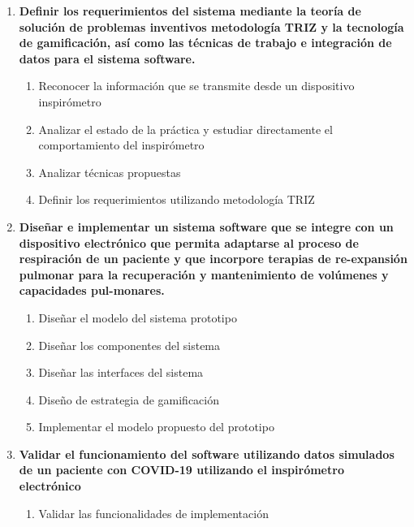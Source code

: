 \begin{enumerate}
\begin{enumerate}
  \end{enumerate}
  \item \textbf{Definir los requerimientos del sistema mediante la teor\'ia de soluci\'on de problemas inventivos metodolog\'ia TRIZ y la tecnolog\'ia de gamificaci\'on, as\'i como las t\'ecnicas de trabajo e integraci\'on de datos para el sistema software.}
  \begin{enumerate}
    \item Reconocer la informaci\'on que se transmite desde un dispositivo inspir\'ometro
    \item Analizar el estado de la pr\'actica y estudiar directamente el comportamiento del inspir\'ometro
    \item Analizar t\'ecnicas propuestas
    \item Definir los requerimientos utilizando metodolog\'ia TRIZ
  \end{enumerate}
  \item  \textbf{Dise\~{n}ar e implementar un sistema software que se integre con un dispositivo electr\'onico que permita adaptarse al proceso de respiraci\'on de un paciente y que incorpore terapias de re-expansi\'on pulmonar para la recuperaci\'on y mantenimiento de vol\'umenes y capacidades pul-monares.}
  \begin{enumerate}
    \item Dise\~{n}ar el modelo del sistema prototipo
    \item Dise\~{n}ar los componentes del sistema
    \item Dise\~{n}ar las interfaces del sistema
    \item Dise\~{n}o de estrategia de gamificaci\'on
    \item Implementar el modelo propuesto del prototipo
  \end{enumerate}
  \item \textbf{Validar el funcionamiento del software utilizando datos simulados de un paciente con COVID-19 utilizando el inspir\'ometro electr\'onico}
  \begin{enumerate}
    \item Validar las funcionalidades de implementaci\'on
\end{enumerate}
  
\end{enumerate}




